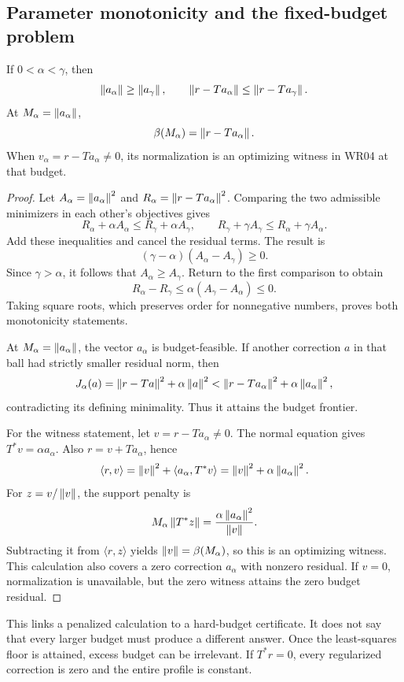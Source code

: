 \subsection{Parameter monotonicity and the fixed-budget problem}
\begin{proposition}\label{WR07}
If $0<\alpha<\gamma$, then
\[
 \left\lVert a_\alpha\right\rVert\ge\left\lVert a_\gamma\right\rVert,\qquad
 \left\lVert r-Ta_\alpha\right\rVert\le\left\lVert r-Ta_\gamma\right\rVert.
\]
At $M_\alpha=\left\lVert a_\alpha\right\rVert$,
\[
 \beta(M_\alpha)=\left\lVert r-Ta_\alpha\right\rVert.
\]
When $v_\alpha=r-Ta_\alpha\ne0$, its normalization is an optimizing witness in WR04 at that budget.
\end{proposition}
\begin{proof}
Let $A_\alpha=\left\lVert a_\alpha\right\rVert^2$ and $R_\alpha=\left\lVert r-Ta_\alpha\right\rVert^2$. Comparing the two admissible minimizers in each other's objectives gives
\[
 R_\alpha+\alpha A_\alpha\le R_\gamma+\alpha A_\gamma,
 \qquad R_\gamma+\gamma A_\gamma\le R_\alpha+\gamma A_\alpha.
\]
Add these inequalities and cancel the residual terms. The result is
\[
 (\gamma-\alpha)(A_\alpha-A_\gamma)\ge0.
\]
Since $\gamma>\alpha$, it follows that $A_\alpha\ge A_\gamma$. Return to the first comparison to obtain
\[
 R_\alpha-R_\gamma\le\alpha(A_\gamma-A_\alpha)\le0.
\]
Taking square roots, which preserves order for nonnegative numbers, proves both monotonicity statements.

At $M_\alpha=\left\lVert a_\alpha\right\rVert$, the vector $a_\alpha$ is budget-feasible. If another correction $a$ in that ball had strictly smaller residual norm, then
\[
 J_\alpha(a)
 =\left\lVert r-Ta\right\rVert^2+\alpha\left\lVert a\right\rVert^2
 <\left\lVert r-Ta_\alpha\right\rVert^2+\alpha\left\lVert a_\alpha\right\rVert^2,
\]
contradicting its defining minimality. Thus it attains the budget frontier.

For the witness statement, let $v=r-Ta_\alpha\ne0$. The normal equation gives $T^*v=\alpha a_\alpha$. Also $r=v+Ta_\alpha$, hence
\[
 \langle r,v\rangle
 =\left\lVert v\right\rVert^2+\langle a_\alpha,T^*v\rangle
 =\left\lVert v\right\rVert^2+\alpha\left\lVert a_\alpha\right\rVert^2.
\]
For $z=v/\left\lVert v\right\rVert$, the support penalty is
\[
 M_\alpha\left\lVert T^*z\right\rVert
 =\frac{\alpha\left\lVert a_\alpha\right\rVert^2}{\left\lVert v\right\rVert}.
\]
Subtracting it from $\langle r,z\rangle$ yields $\left\lVert v\right\rVert=\beta(M_\alpha)$, so this is an optimizing witness. This calculation also covers a zero correction $a_\alpha$ with nonzero residual. If $v=0$, normalization is unavailable, but the zero witness attains the zero budget residual.
\end{proof}

This links a penalized calculation to a hard-budget certificate. It does not say that every larger budget must produce a different answer. Once the least-squares floor is attained, excess budget can be irrelevant. If $T^*r=0$, every regularized correction is zero and the entire profile is constant.

